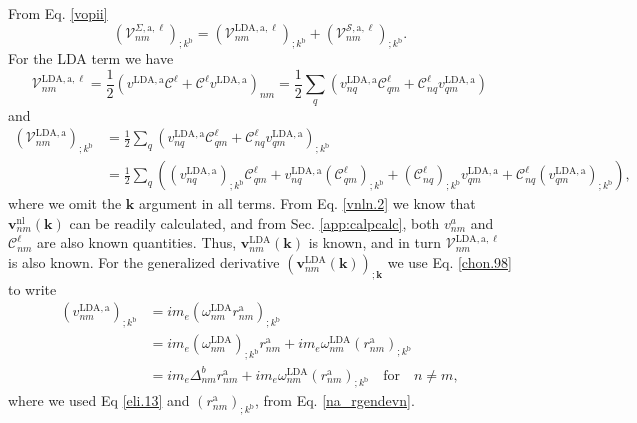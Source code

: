From Eq. \eqref{vopii}
\begin{equation}\label{a.1}
\left(\mathcal{V}^{\Sigma,\mathrm{a},\ell}_{nm}\right)_{;k^\mathrm{b}}
= \left(\mathcal{V}^{\mathrm{LDA},\mathrm{a},\ell}_{nm}\right)_{;k^\mathrm{b}}
+ \left(\mathcal{V}^{{\mathcal{S}},\mathrm{a},\ell}_{nm}\right)_{;k^\mathrm{b}}.
\end{equation} 
For the LDA term we have
\begin{equation}\label{a.2}
\mathcal{V}^{\mathrm{LDA},\mathrm{a},\ell}_{nm}
= \frac{1}{2}
\left(v^{\mathrm{LDA},\mathrm{a}}\mathcal{C}^{\ell}
      + \mathcal{C}^{\ell} v^{\mathrm{LDA},\mathrm{a}}\right)_{nm} 
= \frac{1}{2}\sum_{q}
\left(
  v^{\mathrm{LDA},\mathrm{a}}_{nq}\mathcal{C}^{\ell}_{qm}
+ \mathcal{C}^{\ell}_{nq} v^{\mathrm{LDA},\mathrm{a}}_{qm}
\right)
\end{equation}
and
\begin{align}\label{a.2a}
\left(\mathcal{V}^{\mathrm{LDA},\mathrm{a}}_{nm}\right)_{;k^\mathrm{b}}
&= \frac{1}{2}\sum_{q}\left(  
  v^{\mathrm{LDA},\mathrm{a}}_{nq}\mathcal{C}^{\ell}_{qm}
+ \mathcal{C}^{\ell}_{nq}v^{\mathrm{LDA},\mathrm{a}}_{qm}
\right)_{;k^\mathrm{b}}\nonumber\\
&= \frac{1}{2}\sum_{q}\left(
  (v^{\mathrm{LDA},\mathrm{a}}_{nq})_{;k^\mathrm{b}}\mathcal{C}^{\ell}_{qm}
+  v^{\mathrm{LDA},\mathrm{a}}_{nq}(\mathcal{C}^{\ell}_{qm})_{;k^\mathrm{b}}
+ (\mathcal{C}^{\ell}_{nq})_{;k^\mathrm{b}} v^{\mathrm{LDA},\mathrm{a}}_{qm}
+ \mathcal{C}^{\ell}_{nq} (v^{\mathrm{LDA},\mathrm{a}}_{qm})_{;k^\mathrm{b}}
\right),
\end{align}   
where we omit the $\mathbf{k}$ argument in all terms. From Eq. \eqref{vnln.2} we
know that $\mathbf{v}^\mathrm{nl}_{nm}(\mathbf{k})$ can be readily calculated,
and from Sec. \ref{app:calpcalc}, both $v^{a}_{nm}$ and $\mathcal{C}_{nm}^{\ell}$
are also known quantities. Thus, $\mathbf{v}^\mathrm{LDA}_{nm}(\mathbf{k})$ is
known, and in turn $\mathcal{V}^{\mathrm{LDA},\mathrm{a},\ell}_{nm}$ is also
known. For the generalized derivative
$(\mathbf{v}^\mathrm{LDA}_{nm}(\mathbf{k}))_{;\mathbf{k}}$ we use Eq.
\eqref{chon.98} to write
\begin{align}\label{a.3}
(v^{\mathrm{LDA},\mathrm{a}}_{nm})_{;k^\mathrm{b}}
&= im_{e}(\omega^\mathrm{LDA}_{nm}r^\mathrm{a}_{nm})_{;k^\mathrm{b}}\nonumber\\
&= im_{e}(\omega^\mathrm{LDA}_{nm})_{;k^\mathrm{b}} r^\mathrm{a}_{nm}
 + im_{e}\omega^\mathrm{LDA}_{nm}(r^\mathrm{a}_{nm})_{;k^\mathrm{b}}\nonumber\\
&= im_{e}\Delta^b_{nm}r^\mathrm{a}_{nm}
 + im_{e}\omega^\mathrm{LDA}_{nm}(r^\mathrm{a}_{nm})_{;k^\mathrm{b}}
   \quad\mathrm{for}\quad n\ne m,
\end{align} 
where we used Eq \eqref{eli.13} and $(r^\mathrm{a}_{nm})_{;k^\mathrm{b}}$, from
Eq. \eqref{na_rgendevn}.

